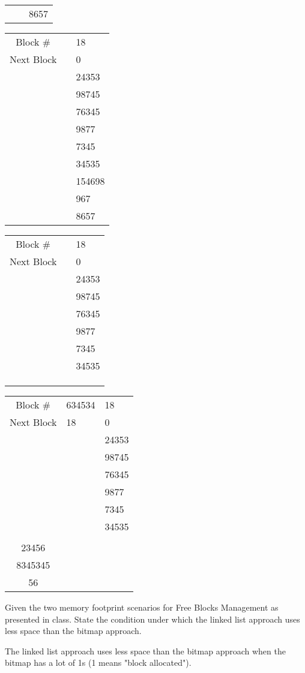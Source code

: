 \documentclass[a4paper,11pt]{exam}
\begin{document}
\begin{questions}
\begin{tabular}{|c|p{3.25em}|p{3.25em}|}
	&  & 8657 \\ \cline{1-3}
\end{tabular}
\begin{tabular}{|c|p{3.25em}|p{3.25em}|}
\hline
Block \# &  & 18 \\ \cline{1-3}
Next Block & & 0 \\ \cline{1-3}
\multirow{5}{*}{} & & 24353 \\ \cline{2-3}
	&  & 98745 \\ \cline{2-3}
	&  & 76345 \\ \cline{2-3}
	&  & 9877 \\ \cline{2-3}
	&  & 7345 \\ \cline{2-3}
	&  & 34535 \\ \cline{2-3}
	&  & 154698 \\ \cline{2-3}
	&  & 967 \\ \cline{2-3}
	&  & 8657 \\ \cline{1-3}
\end{tabular}

\begin{tabular}{|c|p{3.25em}|p{3.25em}|}
\hline
Block \# & & 18 \\ \cline{1-3}
Next Block & & 0 \\ \cline{1-3}
\multirow{5}{*}{} & & 24353 \\ \cline{2-3}
	&  & 98745 \\ \cline{2-3}
	&  & 76345 \\ \cline{2-3}
	&  & 9877 \\ \cline{2-3}
	&  & 7345 \\ \cline{2-3}
	&  & 34535 \\ \cline{2-3}
	&  &  \\ \cline{2-3}
	&  &  \\ \cline{2-3}
	&  &  \\ \cline{1-3}
\end{tabular}
\begin{tabular}{|c|p{3.25em}|p{3.25em}|}
\hline
Block \# & 634534 & 18 \\ \cline{1-3}
Next Block & 18 & 0 \\ \cline{1-3}
\multirow{5}{*}{} &  & 24353 \\ \cline{2-3}
	&  & 98745 \\ \cline{2-3}
	&  & 76345 \\ \cline{2-3}
	&  & 9877 \\ \cline{2-3}
	&  & 7345 \\ \cline{2-3}
	&  & 34535 \\ \cline{2-3}
	&  &  \\ 23456 \cline{2-3}
	&  &  \\ 8345345 \cline{2-3}
	&  &  \\ 56 \cline{1-3}
\end{tabular}
Given the two memory footprint scenarios for Free Blocks Management as presented in class. State the condition under which the linked list approach uses less space than the bitmap approach.


The linked list approach uses less space than the bitmap approach when the bitmap has a lot of 1s (1 means "block allocated"). 
\end{questions}
\end{document}
